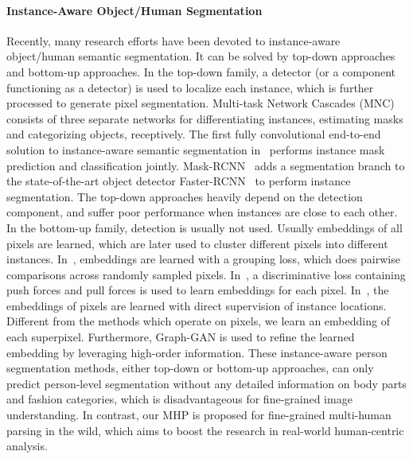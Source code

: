 \documentclass[10pt, letterpaper]{article}
\begin{document}
\paragraph{Instance-Aware Object/Human Segmentation}
Recently, many research efforts have been devoted to instance-aware object/human semantic segmentation. It can be solved by top-down approaches and bottom-up approaches. In the top-down family,  a detector (or a component functioning as a detector) is used to localize each instance, which is further processed to generate pixel segmentation. Multi-task Network Cascades (MNC)~\cite{dai2016instance} consists of three separate networks for differentiating instances, estimating masks and categorizing objects, receptively.  The first fully convolutional end-to-end solution to instance-aware semantic segmentation in~\cite{li2016fully} performs instance mask prediction and classification jointly. Mask-RCNN~\cite{he2017mask} adds a segmentation branch to the state-of-the-art object detector Faster-RCNN~\cite{ren2015faster} to perform instance segmentation. The top-down approaches heavily depend on the detection component, and suffer poor performance when instances are close to each other. In the bottom-up family, detection is usually not used. Usually embeddings of all pixels are learned, which are later used to cluster different pixels into different instances.  In~\cite{newell2016associative}, embeddings are learned with a grouping loss, which does pairwise comparisons across randomly sampled pixels. In~\cite{de2017semantic,neven2017fast}, a discriminative loss containing push forces and pull forces is used to learn embeddings for each pixel. In~\cite{liang2015proposal}, the embeddings of pixels are learned with direct supervision of instance locations. Different from the methods which operate on pixels, we learn an embedding of each superpixel. Furthermore, Graph-GAN is used to refine the learned embedding by leveraging high-order information. These instance-aware person segmentation methods, either top-down or bottom-up approaches, can only predict person-level segmentation without any detailed information on body parts and fashion categories, which is disadvantageous for fine-grained image understanding. In contrast, our MHP is proposed for fine-grained multi-human parsing in the wild, which aims to boost the research in real-world human-centric analysis. 
\end{document}
